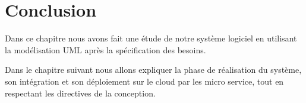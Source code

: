    
   \section{Conclusion}
   
   Dans ce chapitre nous avons fait une étude de notre système logiciel en utilisant la modélisation UML après la spécification des besoins.
   
     Dans le chapitre suivant nous allons expliquer la phase de réalisation du système, son intégration et son déploiement sur le  cloud par les micro service, tout en respectant les directives de la conception.
    
   